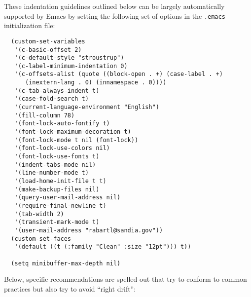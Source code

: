 These indentation guidelines outlined below can be largely automatically
supported by Emacs by setting the following set of options in the
{}\texttt{.emacs} initialization file:
%
{\small\begin{verbatim}
  (custom-set-variables
   '(c-basic-offset 2)
   '(c-default-style "stroustrup")
   '(c-label-minimum-indentation 0)
   '(c-offsets-alist (quote ((block-open . +) (case-label . +)
      (inextern-lang . 0) (innamespace . 0))))
   '(c-tab-always-indent t)
   '(case-fold-search t)
   '(current-language-environment "English")
   '(fill-column 78)
   '(font-lock-auto-fontify t)
   '(font-lock-maximum-decoration t)
   '(font-lock-mode t nil (font-lock))
   '(font-lock-use-colors nil)
   '(font-lock-use-fonts t)
   '(indent-tabs-mode nil)
   '(line-number-mode t)
   '(load-home-init-file t t)
   '(make-backup-files nil)
   '(query-user-mail-address nil)
   '(require-final-newline t)
   '(tab-width 2)
   '(transient-mark-mode t)
   '(user-mail-address "rabartl@sandia.gov"))
  (custom-set-faces
   '(default ((t (:family "Clean" :size "12pt"))) t))
  
  (setq minibuffer-max-depth nil)
\end{verbatim}}
%
Below, specific recommendations are spelled out that try to conform to common
practices but also try to avoid ``right drift'':

